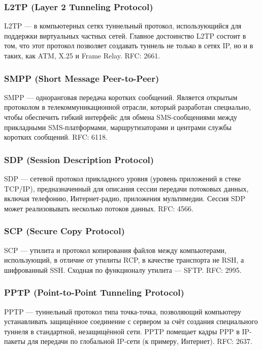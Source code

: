 \subsubsection{L2TP (Layer 2 Tunneling Protocol)}
L2TP — в компьютерных сетях туннельный протокол, использующийся для поддержки
виртуальных частных сетей. Главное достоинство L2TP состоит в том, что этот протокол
позволяет создавать туннель не только в сетях IP, но и в таких, как ATM, X.25 и Frame Relay.
RFC: 2661.

\subsubsection{SMPP (Short Message Peer-to-Peer)}
SMPP — одноранговая передача коротких сообщений. Является открытым протоколом в
телекоммуникационной отрасли, который разработан специально, чтобы обеспечить гибкий
интерфейс для обмена SMS-сообщениями между прикладными SMS-платформами,
маршрутизаторами и центрами службы коротких сообщений. RFC: 6118.

\subsubsection{SDP (Session Description Protocol)}
SDP — сетевой протокол прикладного уровня (уровень приложений в стеке TCP/IP),
предназначенный для описания сессии передачи потоковых данных, включая телефонию,
Интернет-радио, приложения мультимедии. Сессия SDP может реализовывать несколько
потоков данных. RFC: 4566.

\subsubsection{SCP (Secure Copy Protocol)}
SCP — утилита и протокол копирования файлов между компьютерами, использующий, в
отличие от утилиты RCP, в качестве транспорта не RSH, а шифрованный SSH. Сходная по
функционалу утилита — SFTP. RFC: 2995.

\subsubsection{PPTP (Point-to-Point Tunneling Protocol)}
PPTP — туннельный протокол типа точка-точка, позволяющий компьютеру устанавливать
защищённое соединение с сервером за счёт создания специального туннеля в стандартной,
незащищённой сети. PPTP помещает кадры PPP в IP-пакеты для передачи по глобальной IP-сети
(к примеру, Интернет). RFC: 2637.

\endinput

